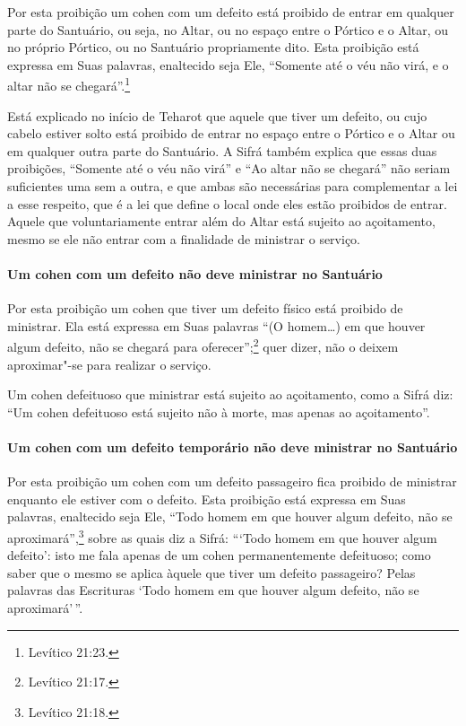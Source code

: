 \begin{multicols}{2}
Por esta proibição um cohen\starr{} com um defeito está proibido de entrar
em qualquer parte do Santuário, ou seja, no Altar, ou no espaço entre o
Pórtico e o Altar, ou no próprio Pórtico, ou no Santuário propriamente
dito. Esta proibição está expressa em Suas palavras, enaltecido seja
Ele, ``Somente até o véu não virá, e o altar não se chegará''.\footnote{Levítico
21:23.}

Está explicado no início de Teharot\starr{} que aquele que tiver um defeito, ou
cujo cabelo estiver solto está proibido de entrar no espaço entre o
Pórtico e o Altar ou em qualquer outra parte do Santuário. A Sifrá\starr{}
também explica que essas duas proibições, ``Somente até o véu não virá''
e ``Ao altar não se chegará'' não seriam suficientes uma sem a outra, e
que ambas são necessárias para complementar a lei a esse respeito, que é
a lei que define o local onde eles estão proibidos de entrar. Aquele que
voluntariamente entrar além do Altar está sujeito ao açoitamento, mesmo
se ele não entrar com a finalidade de ministrar o serviço.

\paragraph{Um cohen\starr{} com um defeito não deve ministrar no Santuário}

Por esta proibição um cohen\starr{} que tiver um defeito físico está
proibido de ministrar. Ela está expressa em Suas palavras ``(O homem\ldots{})
em que houver algum defeito, não se chegará para oferecer'';\footnote{Levítico
21:17.} quer dizer, não o deixem aproximar"-se para realizar o serviço.

Um cohen\starr{} defeituoso que ministrar está sujeito ao açoitamento, como
a Sifrá\starr{} diz: ``Um cohen\starr{} defeituoso está sujeito não à morte, mas
apenas ao açoitamento''.

\paragraph{Um cohen\starr{} com um defeito temporário não deve ministrar no Santuário}

Por esta proibição um cohen\starr{} com um defeito passageiro fica proibido
de ministrar enquanto ele estiver com o defeito. Esta proibição está
expressa em Suas palavras, enaltecido seja Ele, ``Todo homem em que
houver algum defeito, não se aproximará'',\footnote{Levítico 21:18.} sobre as
quais diz a Sifrá\starr: ```Todo homem em que houver algum defeito': isto me
fala apenas de um cohen\starr{} permanentemente defeituoso; como saber que o mesmo se aplica àquele que tiver um defeito passageiro? Pelas palavras das Escrituras `Todo homem
em que houver algum defeito, não se aproximará'\,''.


\end{multicols}
